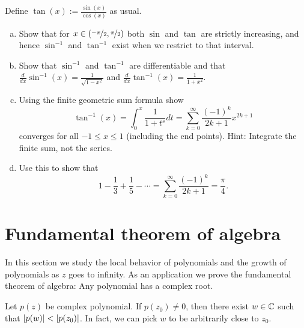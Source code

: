 \begin{exercise}
Define $\tan(x) := \frac{\sin(x)}{\cos(x)}$ as usual.
\begin{enumerate}[a)]
\item
Show that for $x \in (\nicefrac{-\pi}{2},\nicefrac{\pi}{2})$
both $\sin$ and $\tan$ are strictly increasing, and hence $\sin^{-1}$
and $\tan^{-1}$ exist when we restrict to that interval.
\item
Show that $\sin^{-1}$ and $\tan^{-1}$ are differentiable
and
that
$\frac{d}{dx} \sin^{-1}(x) = \frac{1}{\sqrt{1-x^2}}$ and
$\frac{d}{dx} \tan^{-1}(x) = \frac{1}{1+x^2}$.
\item
Using the finite geometric sum formula show
\begin{equation*}
\tan^{-1}(x) = \int_0^x \frac{1}{1+t^s} dt
=
\sum_{k=0}^\infty \frac{{(-1)}^k}{2k+1} x^{2k+1}
\end{equation*}
converges for all $-1 \leq x \leq 1$ (including the end points).
Hint: Integrate the finite sum, not the series.
\item
Use this to show that
\begin{equation*}
1 - \frac{1}{3} + \frac{1}{5} - \cdots
=
\sum_{k=0}^\infty \frac{{(-1)}^k}{2k+1}
=
\frac{\pi}{4} .
\end{equation*}
\end{enumerate}
\end{exercise}


\sectionnewpage
\section{Fundamental theorem of algebra}
\label{sec:fundalgeb}


In this section we study the local behavior of polynomials
and the growth of polynomials as $z$ goes to infinity.  As an application
we prove the fundamental theorem of algebra: Any polynomial
has a complex root.

\begin{lemma} \label{lemma:polyalwaysgetssmaller}
Let $p(z)$ be complex polynomial.  If $p(z_0) \not= 0$, then there
exist $w \in {\mathbb{C}}$ such that $\lvert {p(w)} \rvert < \lvert {p(z_0)} \rvert$.  In fact,
we can pick $w$ to be arbitrarily close to $z_0$.
\end{lemma}

